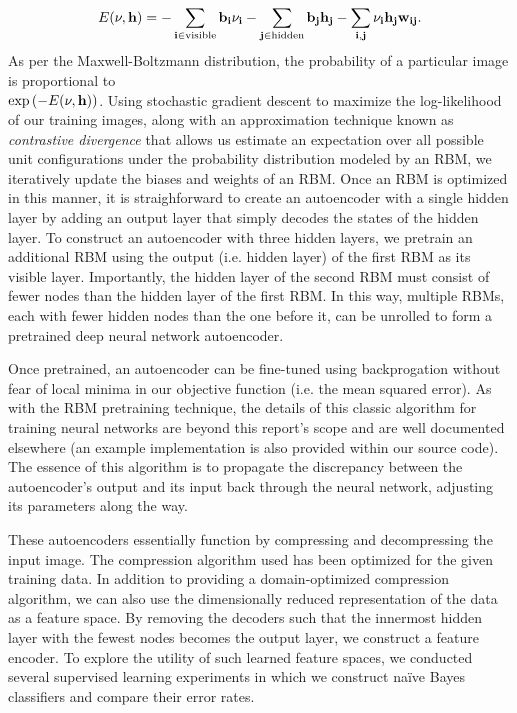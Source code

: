\documentclass{article}
\begin{document}
\begin{equation}
E(\bf{\nu}, \bf{h}) = -\sum_{i\in\mathrm{visible}}{b_i\nu_i} - \sum_{j\in\mathrm{hidden}}{b_jh_j - \sum_{i,j}{\nu_ih_jw_{ij}}}.
\end{equation}
As per the Maxwell-Boltzmann distribution, the probability of a particular image
is proportional to\\$\mathrm{exp}\left(-E(\bf{\nu}, \bf{h})\right)$. Using
stochastic gradient descent to maximize the log-likelihood of our training
images, along with an approximation technique known as {\em contrastive
divergence} that allows us estimate an expectation over all possible unit
configurations under the probability distribution modeled by an RBM, we
iteratively update the biases and weights of an RBM. Once an RBM is optimized in
this manner, it is straighforward to create an autoencoder with a single hidden
layer by adding an output layer that simply decodes the states of the hidden
layer. To construct an autoencoder with three hidden layers, we pretrain an
additional RBM using the output (i.e. hidden layer) of the first RBM as its
visible layer. Importantly, the hidden layer of the second RBM must consist of
fewer nodes than the hidden layer of the first RBM. In this way, multiple RBMs,
each with fewer hidden nodes than the one before it, can be unrolled to form a
pretrained deep neural network autoencoder.

Once pretrained, an autoencoder can be fine-tuned using backprogation without
fear of local minima in our objective function (i.e. the mean squared error). As
with the RBM pretraining technique, the details of this classic algorithm for
training neural networks are beyond this report's scope and are well documented
elsewhere (an example implementation is also provided within our source code).
The essence of this algorithm is to propagate the discrepancy between the
autoencoder's output and its input back through the neural network, adjusting
its parameters along the way.

These autoencoders essentially function by compressing and decompressing the
input image. The compression algorithm used has been optimized for the given
training data. In addition to providing a domain-optimized compression
algorithm, we can also use the dimensionally reduced representation of the data
as a feature space. By removing the decoders such that the innermost hidden
layer with the fewest nodes becomes the output layer, we construct a feature
encoder. To explore the utility of such learned feature spaces, we conducted
several supervised learning experiments in which we construct na\"{i}ve Bayes
classifiers and compare their error rates.
\end{document}
